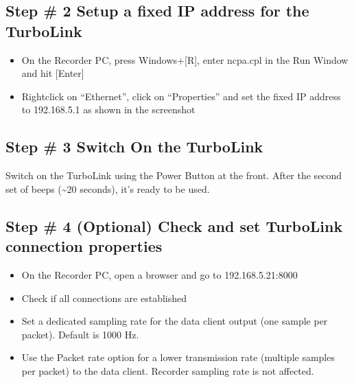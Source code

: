 \documentclass[letterpaper,10pt,english]{sphinxmanual}
\begin{document}
\subsection{Step \# 2 \sphinxhyphen{} Setup a fixed IP address for the TurboLink}
\label{\detokenize{3_setup_biosignal_amplifier:step-2-setup-a-fixed-ip-address-for-the-turbolink}}\begin{itemize}
\item {} 
\sphinxAtStartPar
On the Recorder PC, press Windows+{[}R{]}, enter ncpa.cpl in the Run Window and hit {[}Enter{]}

\item {} 
\sphinxAtStartPar
Right\sphinxhyphen{}click on “Ethernet”, click on “Properties” and set the fixed IP address to 192.168.5.1 as shown in the screenshot

\end{itemize}

\begin{figure}[htbp]
\centering

\noindent{}
\end{figure}


\subsection{Step \# 3 \sphinxhyphen{} Switch On the TurboLink}
\label{\detokenize{3_setup_biosignal_amplifier:step-3-switch-on-the-turbolink}}
\sphinxAtStartPar
Switch on the TurboLink using the Power Button at the front. After the second set of beeps (\textasciitilde{}20 seconds), it’s ready to be used.


\subsection{Step \# 4 (Optional) \sphinxhyphen{} Check and set TurboLink connection properties}
\label{\detokenize{3_setup_biosignal_amplifier:step-4-optional-check-and-set-turbolink-connection-properties}}\begin{itemize}
\item {} 
\sphinxAtStartPar
On the Recorder PC, open a browser and go to 192.168.5.21:8000

\item {} 
\sphinxAtStartPar
Check if all connections are established

\item {} 
\sphinxAtStartPar
Set a dedicated sampling rate for the data client output (one sample per packet). Default is 1000 Hz.

\item {} 
\sphinxAtStartPar
Use the Packet rate option for a lower transmission rate (multiple samples per packet) to the data client. Recorder sampling rate is not affected.

\end{itemize}
\end{document}
